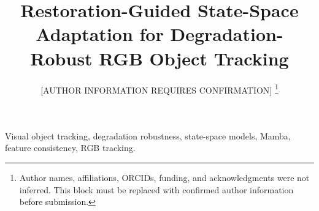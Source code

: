\documentclass[journal]{IEEEtran}
\title{Restoration-Guided State-Space Adaptation for Degradation-Robust RGB Object Tracking}
\author{[AUTHOR INFORMATION REQUIRES CONFIRMATION]%
\thanks{Author names, affiliations, ORCIDs, funding, and acknowledgments were not inferred. This block must be replaced with confirmed author information before submission.}}
\begin{document}
\maketitle



\begin{IEEEkeywords}
Visual object tracking, degradation robustness, state-space models, Mamba, feature consistency, RGB tracking.
\end{IEEEkeywords}












\end{document}
